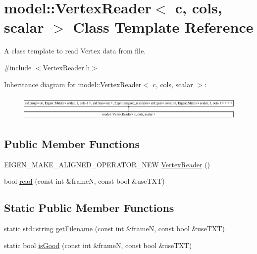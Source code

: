 \hypertarget{classmodel_1_1_vertex_reader}{}\section{model\+:\+:Vertex\+Reader$<$ c, cols, scalar $>$ Class Template Reference}
\label{classmodel_1_1_vertex_reader}


A class template to read Vertex data from file.  




{\ttfamily \#include $<$Vertex\+Reader.\+h$>$}

Inheritance diagram for model\+:\+:Vertex\+Reader$<$ c, cols, scalar $>$\+:\begin{figure}[H]
\begin{center}
\leavevmode
\includegraphics[height=1.269841cm]{classmodel_1_1_vertex_reader}
\end{center}
\end{figure}
\subsection*{Public Member Functions}
\begin{DoxyCompactItemize}
\item 
E\+I\+G\+E\+N\+\_\+\+M\+A\+K\+E\+\_\+\+A\+L\+I\+G\+N\+E\+D\+\_\+\+O\+P\+E\+R\+A\+T\+O\+R\+\_\+\+N\+E\+W \hyperlink{classmodel_1_1_vertex_reader_afd7aa782a2fb65230d1ed46cb19b21a9}{Vertex\+Reader} ()
\item 
bool \hyperlink{classmodel_1_1_vertex_reader_a45d2c59080979838f62cb508ea54ef36}{read} (const int \&frame\+N, const bool \&use\+T\+X\+T)
\end{DoxyCompactItemize}
\subsection*{Static Public Member Functions}
\begin{DoxyCompactItemize}
\item 
static std\+::string \hyperlink{classmodel_1_1_vertex_reader_abdaadfc1ceae14ea776a625829d0f44d}{get\+Filename} (const int \&frame\+N, const bool \&use\+T\+X\+T)
\item 
static bool \hyperlink{classmodel_1_1_vertex_reader_a684c7d96b0d846f561406568552dab9a}{is\+Good} (const int \&frame\+N, const bool \&use\+T\+X\+T)
\end{DoxyCompactItemize}



